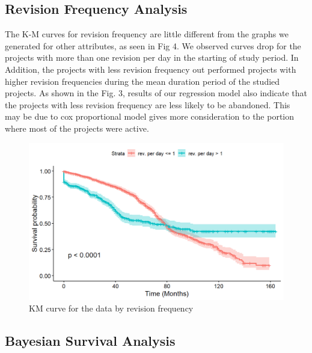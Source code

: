 \documentclass[acmconf]{acmart}
\begin{document}
\subsection{Revision Frequency Analysis}

The K-M curves for revision frequency are little different from the graphs we generated for other attributes, as seen in Fig 4. 
We observed curves drop for the projects with more than one revision per day in the starting of study period.
In Addition, the projects with less revision frequency out performed projects with higher revision frequencies during the mean duration period of the studied projects. 
As shown in the Fig. 3, results of our regression model also indicate that the projects with less revision frequency are less likely to be abandoned. 
This may be due to cox proportional model gives more consideration to the portion where most of the projects were active.

\begin{figure}[!ht]
    \centering
    \includegraphics[scale=0.75]{img/KM-rev_freq.jpg}
    \caption{KM curve for the data by revision frequency }
    \label{fig:freq}
\end{figure}

\subsection{Bayesian Survival Analysis}
\end{document}
